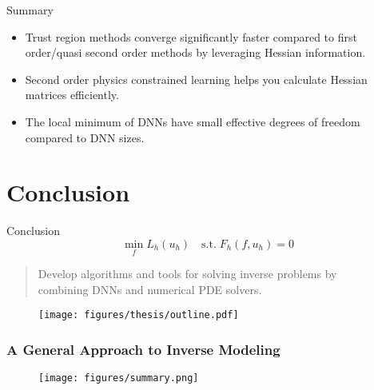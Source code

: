 \documentclass[usenames,dvipsnames]{beamer}
\newcommand{\cmark}{\ding{51}}%
\begin{document}
\begin{frame}{Summary}
	\begin{itemize}
\item Trust region methods converge significantly faster compared to first order/quasi second order methods by leveraging Hessian information. 

\item Second order physics constrained learning helps you calculate Hessian matrices efficiently. 

\item The local minimum of DNNs have small effective degrees of freedom compared to DNN sizes. 
	\end{itemize}
\end{frame}


\section{Conclusion}

\begin{frame}{Conclusion}
	$$\min_{{f}} L_h(u_h) \quad \mathrm{s.t.}\; F_h({f}, u_h) = 0$$
	
	\begin{quote}
		\textcolor{green}{\cmark} Develop algorithms and tools for solving inverse problems by \\ combining DNNs and numerical PDE solvers. 
	\end{quote}
	
	
	\begin{figure}[hbt]
		\centering
		\texttt{[image: figures/thesis/outline.pdf]}
	\end{figure}
\end{frame}

\begin{frame}
	\frametitle{A General Approach to Inverse Modeling}
	\begin{figure}[hbt]
		\texttt{[image: figures/summary.png]}
	\end{figure}
\end{frame}


\iffalse

\begin{frame}
\frametitle{Acknowledgement}

\begin{figure}[hbt]
	\centering
	\texttt{[image: figures/thesis/family.png]}
\end{figure}



\end{frame}
\fi 
\end{document}
